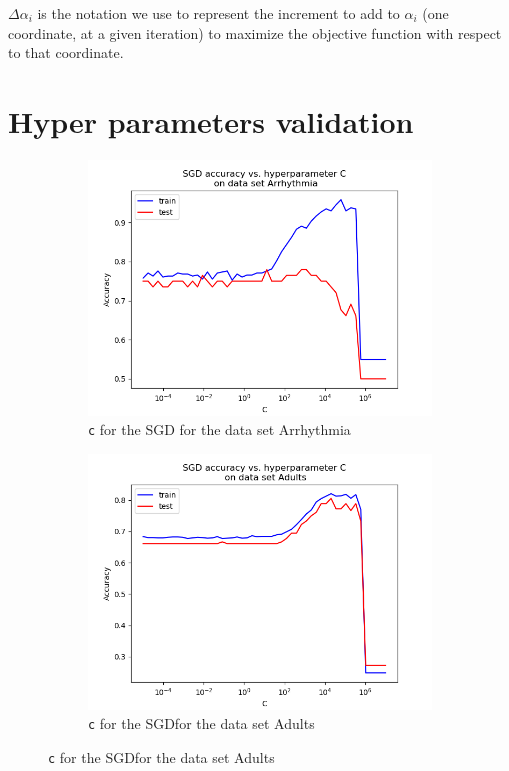 \documentclass{article}
\begin{document}
$\Delta \alpha_i$ is the notation we use to represent the increment to add to $\alpha_i$ (one coordinate, at a given iteration) to maximize the objective function with respect to that coordinate.


\section{Hyper parameters validation}
\label{appendix-hyperparams}

\begin{figure}[H]
	\centering
	\begin{subfigure}[t]{0.45\linewidth}
		\includegraphics[width=\linewidth]{figs/hyperparams/arrhythmia_sgd_c.png}
		\caption{\texttt{c} for the SGD for the data set Arrhythmia}
	\end{subfigure}
	\begin{subfigure}[t]{0.45\linewidth}
		\includegraphics[width=\linewidth]{figs/hyperparams/adults_sgd_c.png}
		\caption{\texttt{c} for the SGDfor the data set Adults}
	\end{subfigure}


\end{figure}
\end{document}
